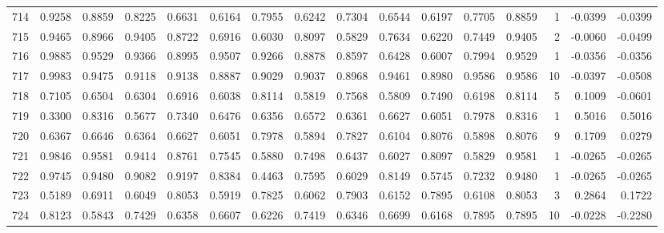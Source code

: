 \begin{tabular}{lrrrrrrrrrrrrrrr}
714 &      0.9258 &  0.8859 &  0.8225 &  0.6631 &  0.6164 &  0.7955 &  0.6242 &  0.7304 &  0.6544 &  0.6197 &   0.7705 &     0.8859 &      1 &                   -0.0399 &                    -0.0399 \\
715 &      0.9465 &  0.8966 &  0.9405 &  0.8722 &  0.6916 &  0.6030 &  0.8097 &  0.5829 &  0.7634 &  0.6220 &   0.7449 &     0.9405 &      2 &                   -0.0060 &                    -0.0499 \\
716 &      0.9885 &  0.9529 &  0.9366 &  0.8995 &  0.9507 &  0.9266 &  0.8878 &  0.8597 &  0.6428 &  0.6007 &   0.7994 &     0.9529 &      1 &                   -0.0356 &                    -0.0356 \\
717 &      0.9983 &  0.9475 &  0.9118 &  0.9138 &  0.8887 &  0.9029 &  0.9037 &  0.8968 &  0.9461 &  0.8980 &   0.9586 &     0.9586 &     10 &                   -0.0397 &                    -0.0508 \\
718 &      0.7105 &  0.6504 &  0.6304 &  0.6916 &  0.6038 &  0.8114 &  0.5819 &  0.7568 &  0.5809 &  0.7490 &   0.6198 &     0.8114 &      5 &                    0.1009 &                    -0.0601 \\
719 &      0.3300 &  0.8316 &  0.5677 &  0.7340 &  0.6476 &  0.6356 &  0.6572 &  0.6361 &  0.6627 &  0.6051 &   0.7978 &     0.8316 &      1 &                    0.5016 &                     0.5016 \\
720 &      0.6367 &  0.6646 &  0.6364 &  0.6627 &  0.6051 &  0.7978 &  0.5894 &  0.7827 &  0.6104 &  0.8076 &   0.5898 &     0.8076 &      9 &                    0.1709 &                     0.0279 \\
721 &      0.9846 &  0.9581 &  0.9414 &  0.8761 &  0.7545 &  0.5880 &  0.7498 &  0.6437 &  0.6027 &  0.8097 &   0.5829 &     0.9581 &      1 &                   -0.0265 &                    -0.0265 \\
722 &      0.9745 &  0.9480 &  0.9082 &  0.9197 &  0.8384 &  0.4463 &  0.7595 &  0.6029 &  0.8149 &  0.5745 &   0.7232 &     0.9480 &      1 &                   -0.0265 &                    -0.0265 \\
723 &      0.5189 &  0.6911 &  0.6049 &  0.8053 &  0.5919 &  0.7825 &  0.6062 &  0.7903 &  0.6152 &  0.7895 &   0.6108 &     0.8053 &      3 &                    0.2864 &                     0.1722 \\
724 &      0.8123 &  0.5843 &  0.7429 &  0.6358 &  0.6607 &  0.6226 &  0.7419 &  0.6346 &  0.6699 &  0.6168 &   0.7895 &     0.7895 &     10 &                   -0.0228 &                    -0.2280 \\

\end{tabular}
